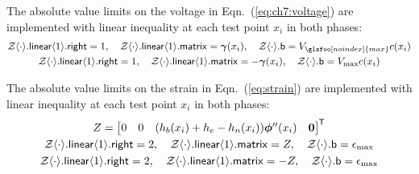 \noindent The absolute value limits on the voltage in Eqn.~(\ref{eq:ch7:voltage}) are implemented with linear inequality at each test point $x_i$ in both phases:%
\begin{subequations}%
\begin{gather}%
\mathcal{Z}\xind{\cdot}.\xvar{linear}\xind{1}.\xvar{right} = 1, \quad  \mathcal{Z}\xind{\cdot}.\xvar{linear}\xind{1}.\xvar{matrix} = \bm{\gamma}(x_i), \quad \mathcal{Z}\xind{\cdot}.\xvar{b} = V_{\glsfoo[noindex]{max}} c(x_i) \\
\mathcal{Z}\xind{\cdot}.\xvar{linear}\xind{1}.\xvar{right} = 1, \quad  \mathcal{Z}\xind{\cdot}.\xvar{linear}\xind{1}.\xvar{matrix} = -\bm{\gamma}(x_i), \quad  \mathcal{Z}\xind{\cdot}.\xvar{b} = V_{\max} c(x_i)
\end{gather}
\end{subequations}

\noindent The absolute value limits on the strain in Eqn.~(\ref{eq:strain}) are implemented with linear inequality at each test point $x_i$ in both phases:%
\begin{subequations}%
\begin{gather}%
Z = \begin{bmatrix} 0 & 0 & (h_b(x_i) + h_e - h_n(x_i)) \bm{\phi}''(x_i) & \bm{0} \end{bmatrix}\tran \\
\mathcal{Z}\xind{\cdot}.\xvar{linear}\xind{1}.\xvar{right} = 2, \quad \mathcal{Z}\xind{\cdot}.\xvar{linear}\xind{1}.\xvar{matrix} = Z, \quad \mathcal{Z}\xind{\cdot}.\xvar{b} = \epsilon_{\max} \\
\mathcal{Z}\xind{\cdot}.\xvar{linear}\xind{1}.\xvar{right} = 2, \quad \mathcal{Z}\xind{\cdot}.\xvar{linear}\xind{1}.\xvar{matrix} = -Z, \quad \mathcal{Z}\xind{\cdot}.\xvar{b} = \epsilon_{\max}
\end{gather}
\end{subequations}